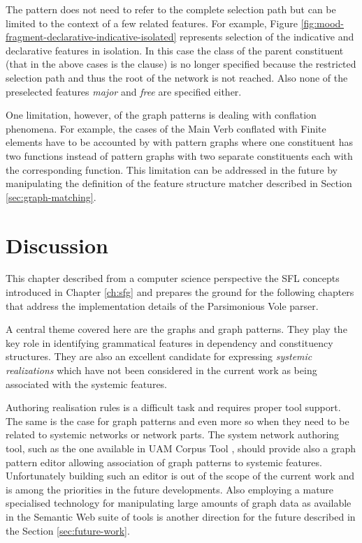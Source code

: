     The pattern does not need to refer to the complete selection path but can be limited to the context of a few related features. For example, Figure \ref{fig:mood-fragment-declarative-indicative-isolated} represents selection of the indicative and declarative features in isolation. In this case the class of the parent constituent (that in the above cases is the clause) is no longer specified because the restricted selection path and thus the root of the network is not reached. Also none of the preselected features \textit{major} and \textit{free} are specified either.  

    One limitation, however, of the graph patterns is dealing with conflation phenomena. For example, the cases of the Main Verb conflated with Finite elements have to be accounted by with pattern graphs where one constituent has two functions instead of pattern graphs with two separate constituents each with the corresponding function. This limitation can be addressed in the future by manipulating the definition of the feature structure matcher described in Section \ref{sec:graph-matching}.

\section{Discussion}
    This chapter described from a computer science perspective the SFL concepts introduced in Chapter \ref{ch:sfg} and prepares the ground for the following chapters that address the implementation details of the Parsimonious Vole parser.  

    A central theme covered here are the graphs and graph patterns. They play the key role in identifying grammatical features in dependency and constituency structures. They are also an excellent candidate for expressing \textit{systemic realizations} which have not been considered in the current work as being associated with the systemic features.  

    Authoring realisation rules is a difficult task and requires proper tool support. The same is the case for graph patterns and even more so when they need to be related to systemic networks or network parts. The system network authoring tool, such as the one available in UAM Corpus Tool \citep{ODonnell2008a}, should provide also a graph pattern editor allowing association of graph patterns to systemic features. Unfortunately building such an editor is out of the scope of the current work and is among the priorities in the future developments. Also employing a mature specialised technology for manipulating large amounts of graph data as available in the Semantic Web suite of tools is another direction for the future described in the Section \ref{sec:future-work}.

